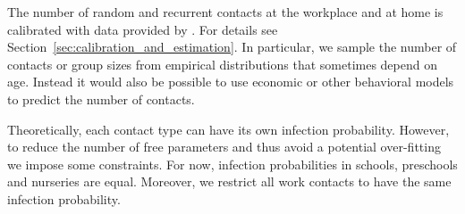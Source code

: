 The number of random and recurrent contacts at the workplace and at home is calibrated
with data provided by \citet{Mossong2008}. For details see
Section~\ref{sec:calibration_and_estimation}. In particular, we sample the number of
contacts or group sizes from empirical distributions that sometimes depend on age.
Instead it would also be possible to use economic or other behavioral models to predict
the number of contacts.

Theoretically, each contact type can have its own infection probability. However, to
reduce the number of free parameters and thus avoid a potential over-fitting we impose
some constraints. For now, infection probabilities in schools, preschools and nurseries
are equal. Moreover, we restrict all work contacts to have the same infection
probability.
